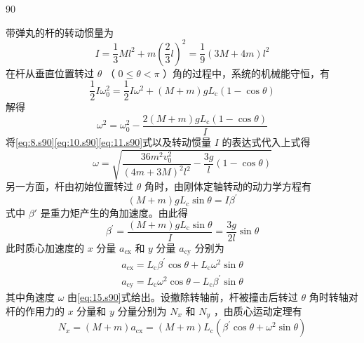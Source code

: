 \begin{solution}{90}
\begin{subsolution}
\begin{equation}
\label{eq:11.s90}
\end{equation}
带弹丸的杆的转动惯量为
\begin{equation}
I = \frac {1}{3} M l ^ {2} + m \left(\frac {2}{3} l\right) ^ {2} = \frac {1}{9} (3 M + 4 m) l ^ {2}
\label{eq:12.s90}
\end{equation}
在杆从垂直位置转过 $\theta$ （ $0 \leq \theta < \pi$ ）角的过程中，系统的机械能守恒，有
\begin{equation}
\frac {1}{2} I \omega_ {0} ^ {2} = \frac {1}{2} I \omega^ {2} + (M + m) g L _ {\mathrm{c}} (1 - \cos \theta)
\label{eq:13.s90}
\end{equation}
解得
\begin{equation}
\omega^ {2} = \omega_ {0} ^ {2} - \frac {2 (M + m) g L _ {\mathrm{c}} (1 - \cos \theta)}{I}
\label{eq:14.s90}
\end{equation}
将\eqref{eq:8.s90}\eqref{eq:10.s90}\eqref{eq:11.s90}式以及转动惯量 $I$ 的表达式代入上式得
\begin{equation}
\omega = \sqrt {\frac {3 6 m ^ {2} v _ {0} ^ {2}}{(4 m + 3 M) ^ {2} l ^ {2}} - \frac {3 g}{l} (1 - \cos \theta)}
\label{eq:15.s90}
\end{equation}
另一方面，杆由初始位置转过 $\theta$ 角时，由刚体定轴转动的动力学方程有
\begin{equation}
(M + m) g L _ {\mathrm{c}} \sin \theta = I \beta^ {\prime}
\label{eq:16.s90}
\end{equation}
式中 $\beta'$ 是重力矩产生的角加速度。由此得
\begin{equation}
\beta^ {\prime} = \frac {(M + m) g L _ {\mathrm{c}} \sin \theta}{I} = \frac {3 g}{2 l} \sin \theta
\label{eq:17.s90}
\end{equation}
此时质心加速度的 $x$ 分量 $a_{\mathrm{cx}}$ 和 $y$ 分量 $a_{\mathrm{cy}}$ 分别为
\begin{equation}
\begin{array}{l} a _ {\mathrm{cx}} = L _ {\mathrm{c}} \beta^ {\prime} \cos \theta + L _ {\mathrm{c}} \omega^ {2} \sin \theta \\ a _ {\mathrm{cy}} = L _ {\mathrm{c}} \omega^ {2} \cos \theta - L _ {\mathrm{c}} \beta^ {\prime} \sin \theta \end{array}
\label{eq:18.s90}
\end{equation}
其中角速度 $\omega$ 由\eqref{eq:15.s90}式给出。设撤除转轴前，杆被撞击后转过 $\theta$ 角时转轴对杆的作用力的 $x$ 分量和 $y$ 分量分别为 $N_{x}$ 和 $N_{y}$ ，由质心运动定理有
\begin{equation}
N _ {x} = (M + m) a _ {\mathrm{cx}} = (M + m) L _ {\mathrm{c}} \left(\beta^ {\prime} \cos \theta + \omega^ {2} \sin \theta\right)

\end{equation}
\end{subsolution}
\end{solution}
